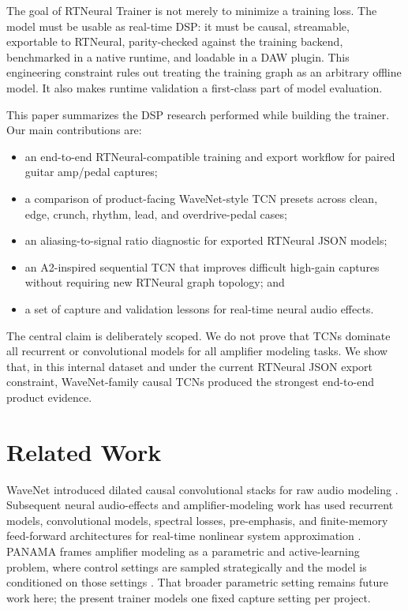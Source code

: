 \documentclass[11pt]{article}
\begin{document}
The goal of RTNeural Trainer is not merely to minimize a training loss. The
model must be usable as real-time DSP: it must be causal, streamable,
exportable to RTNeural, parity-checked against the training backend,
benchmarked in a native runtime, and loadable in a DAW plugin. This engineering
constraint rules out treating the training graph as an arbitrary offline model.
It also makes runtime validation a first-class part of model evaluation.

This paper summarizes the DSP research performed while building the trainer.
Our main contributions are:

\begin{itemize}
  \item an end-to-end RTNeural-compatible training and export workflow for
  paired guitar amp/pedal captures;
  \item a comparison of product-facing WaveNet-style TCN presets across clean,
  edge, crunch, rhythm, lead, and overdrive-pedal cases;
  \item an aliasing-to-signal ratio diagnostic for exported RTNeural JSON
  models;
  \item an A2-inspired sequential TCN that improves difficult high-gain
  captures without requiring new RTNeural graph topology; and
  \item a set of capture and validation lessons for real-time neural audio
  effects.
\end{itemize}

The central claim is deliberately scoped. We do not prove that TCNs dominate
all recurrent or convolutional models for all amplifier modeling tasks. We show
that, in this internal dataset and under the current RTNeural JSON export
constraint, WaveNet-family causal TCNs produced the strongest end-to-end
product evidence.

\section{Related Work}

WaveNet introduced dilated causal convolutional stacks for raw audio modeling
\cite{oord2016wavenet}. Subsequent neural audio-effects and amplifier-modeling
work has used recurrent models, convolutional models, spectral losses,
pre-emphasis, and finite-memory feed-forward architectures for real-time
nonlinear system approximation \cite{damskagg2019tube,steinmetz2022auraloss}.
PANAMA frames amplifier modeling as a parametric and active-learning problem,
where control settings are sampled strategically and the model is conditioned
on those settings \cite{grotschla2025panama}. That broader parametric
setting remains future work here; the present trainer models one fixed capture
setting per project.
\end{document}
